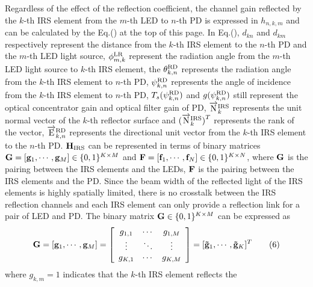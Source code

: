 \documentclass[conference]{IEEEtran}
\begin{document}
   Regardless of the effect of the reflection coefficient, the channel gain 
   reflected by the $k$-th IRS element from the $m$-th LED to  
   $n$-th PD is expressed in $h_{n,k,m}^{}$ and can be calculated by the 
   Eq.() at the top of this page. In Eq.(),
    ${d_{kn}}$ and ${d_{km}}$ respectively represent the distance from the 
   $k$-th IRS element to the $n$-th PD and the $m$-th LED light source, 
   $\phi _{m,k}^{{\rm{LR}}}$ represent the radiation angle from the $m$-th LED 
   light source to $k$-th IRS element, the $\theta _{k,n}^{{\rm{RD}}}$ 
   represents the radiation angle from the $k$-th IRS element to $n$-th 
   PD, $\psi _{k,n}^{{\rm{RD}}}$ represents the angle of incidence 
   from the $k$-th IRS element to $n$-th PD, 
   ${T_s}(\psi _{k,n}^{{\rm{RD}}})$ and $g(\psi _{k,n}^{{\rm{RD}}})$ 
   still represent the optical concentrator gain and optical filter gain of PD, 
   ${\overrightarrow{\rm N}}{_k^{{\rm{IRS}}}}$ represents 
   the unit normal vector of the $k$-th reflector surface and 
   ${(}{\overrightarrow{\rm N}}{_k^{{\rm{IRS}}}}{{\rm{)}}^T}$
   represents the rank of the vector, 
   ${\overrightarrow{\rm E}}{_{k,n}^{{\rm{RD}}}}$
   represents the directional unit vector from the $k$-th IRS element 
   to the $n$-th PD.
   ${{\bf{H}}_{\rm{IRS}}}$ can be represented in terms of binary matrices 
   ${\bf{G}} = [{{\bf{g}}_1}, \cdots ,{{\bf{g}}_M}] \in {\{ 0,1\} ^{K \times M}}$
   and ${\bf{F}} = [{{\bf{f}}_1}, \cdots ,{{\bf{f}}_N}] \in {\{ 0,1\} ^{K \times N}}$,
   where ${\bf{G}}$ is the pairing between the IRS elements and the LEDs, 
   ${\bf{F}}$ is the pairing between the
   IRS elements and the PD. Since the beam width of the reflected light of the 
   IRS elements is highly spatially limited, there is no crosstalk between the 
   IRS reflection channels and each IRS element can only provide a reflection 
   link for a pair of LED and PD. The binary matrix 
   ${\bf{G}} \in {\{ 0,1\} ^{K \times M}}$ can be expressed as
     \begin{equation}
     {\bf{G}}= [{{\bf{g}}_1}, \cdots ,{{\bf{g}}_M}] =
     \left[ {\begin{array}{*{20}{c}}
     {{g_{1,1}}}& \cdots &{{g_{1,M}}}\\
     \vdots & \ddots & \vdots \\
     {{g_{K,1}}}& \cdots &{{g_{K,M}}}
     \end{array}} \right] = {[{{\bf{\tilde g}}_1}, \cdots ,{{\bf{\tilde g}}_K}]^T}
     \tag{6}\label{6}
     \end{equation}
   where ${g_{k,m}} = 1$ indicates that the $k$-th IRS element reflects the 
\end{document}
